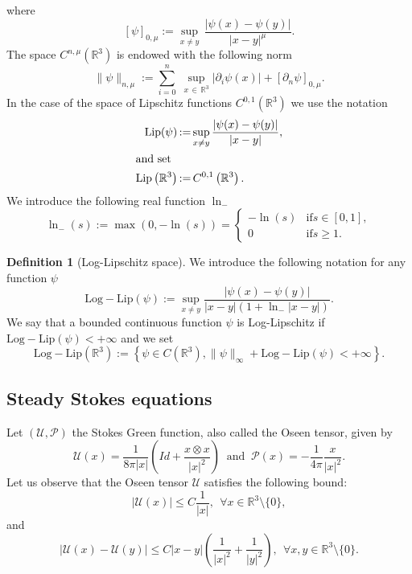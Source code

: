 \documentclass[10pt]{amsart}
\theoremstyle{definition}\newtheorem{defi}[theo]{Definition}\newtheorem{rema}[theo]{Remark}\newtheorem{exam}[theo]{Example}\newtheorem{exem}[theo]{Example}\newtheorem{nota}[theo]{Notation}
\newcommand{\Lip}{\mathrm{Lip}}
\newcommand{\LLip}{\mathrm{Log-Lip}}
\newcommand{\R}{\mathbb{R}}
\newcommand{\clP}{\mathcal{P}}
\newcommand{\clU}{\mathcal{U}}
\renewcommand{\leq}{\leqslant}
\renewcommand{\geq}{\geqslant}
\let\oldforall\forall
\renewcommand*{\forall}{\mathrel{\oldforall}}
\begin{document}
where
\[
[\psi]_{0,\mu} := \underset{x \neq y}{\sup}\, \frac{|\psi (x)-\psi (y)|}{|x-y|^\mu}.
\]
The space $ C^{n,\mu}(\R^3)$ is endowed with the following norm
\[
\|\psi\|_{n,\mu}:= \underset{i=0}{\overset{n}{\sum}}\;\underset{x\,\in\,\R^3}{\sup}|\partial_i \psi(x)|+ [\partial_n \psi]_{0,\mu}.
\]
In the case of the space of Lipschitz functions $ C^{0,1}(\R^3) $ we use the notation
\begin{align*}
\Lip(\psi)\, &{:=}\, \underset{x \neq y}{\sup}\, \frac{|\psi(x)-\psi(y)|}{|x-y|},
\\
\intertext{and set}
\Lip\left(\R^3\right)\, &{:=}\, C^{0,1}\left(\R^3\right).
\end{align*}
We introduce the following real function $\ln_{-}$
\begin{equation}\label{def_ln-}
\ln_{-}(s):=\max(0,-\ln(s))=
\begin{cases}
-\ln(s) &\text{if} s\in[0,1], \\
0 &\text{if} s \geq 1.
\end{cases}
\end{equation}
\begin{defi}[Log-Lipschitz space]\label{def:LLspace}
We introduce the following notation for any function $\psi$
\[
\LLip(\psi):= \underset{x \neq y}{\sup} \frac{|\psi(x)-\psi(y)|}{|x-y|(1+\ln_{-}|x-y|)}.
\]
We say that a bounded continuous function $\psi$ is Log-Lipschitz if\ $\LLip(\psi)<+\infty$ and we set
\[
\LLip\left(\R^3\right):=\left\{\psi \in C\left(\R^3\right), \|\psi\|_\infty+ \LLip(\psi)<+\infty \right\}.
\]
\end{defi}



\subsection{Steady Stokes equations}\label{SSE}


Let $(\clU,\clP)$ the Stokes Green function, also called the Oseen tensor, given by
\begin{equation}\label{Oseen}
\clU(x)= \frac{1}{8\pi |x|} \left(Id + \frac{x \otimes x}{|x|^2} \right) \ \text{ and } \ \clP(x)=- \frac{1}{4\pi} \frac{x}{|x|^2}.
\end{equation}
Let us observe that the Oseen tensor $\clU$ satisfies the following bound:
\begin{equation}\label{B-prop}
\left|\clU(x) \right|\leq C \frac{1}{|x|}, \: \: \forall x \in \R^3 \setminus \{0\},
\end{equation}
and
\begin{equation}\label{Lip-prop}
\left|\clU(x)-\clU(y) \right|\leq C |x-y| \left(\frac{1}{|x|^2}+ \frac{1}{|y|^2} \right), \: \: \forall x, y \in \R^3 \setminus \{0\}.
\end{equation}
\end{document}
